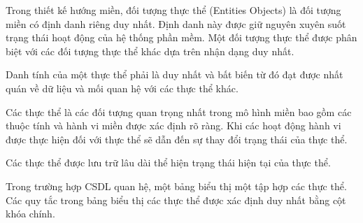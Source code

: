 Trong  thiết kế hướng miền, đối tượng thực thể (Entities Objects)  là        đối tượng miền   có định danh riêng duy nhất. Định danh này được giữ nguyên xuyên suốt trạng thái hoạt động của hệ thống phần mềm. Một đối tượng       thực thể     được phân biệt với các đối tượng thực thể  khác dựa trên nhận dạng duy nhất.

Danh tính của một thực thể phải là duy nhất và bất biến từ đó đạt được nhất quán về dữ liệu    và mối quan hệ với các thực thể   khác.


Các thực thể   là các đối tượng quan trọng nhất trong mô hình miền     bao gồm các thuộc tính và hành vi miền được xác định rõ ràng.  Khi các hoạt động  hành vi được thực hiện đối với thực thể sẽ dẫn đến sự thay đổi trạng thái của thực thể.

Các thực thể được lưu trữ lâu dài thể hiện trạng thái hiện tại của thực thể. 


\begin{example}     Trong trường hợp CSDL quan hệ, một bảng biểu thị một tập hợp các thực thể. Các quy tắc trong bảng biểu thị các thực thể được xác định duy nhất bằng cột khóa chính.
    
\end{example}



